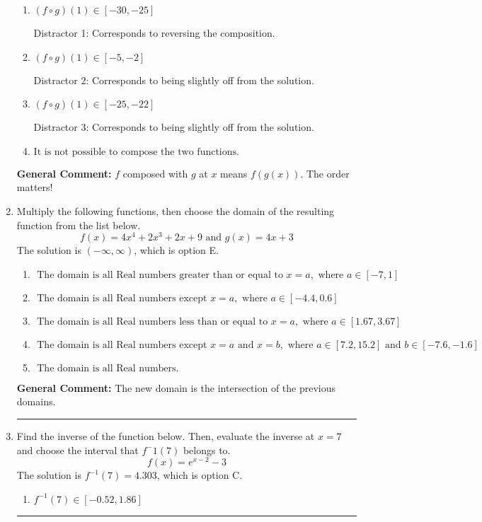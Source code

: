 \documentclass{extbook}[14pt]
\newcommand{\litem}[1]{\item #1

\rule{\textwidth}{0.4pt}}
\begin{document}
\begin{enumerate}
{\begin{enumerate}[label=\Alph*.]
* This is the correct solution
\item \( (f \circ g)(1) \in [-30, -25] \)

 Distractor 1: Corresponds to reversing the composition.
\item \( (f \circ g)(1) \in [-5, -2] \)

 Distractor 2: Corresponds to being slightly off from the solution.
\item \( (f \circ g)(1) \in [-25, -22] \)

 Distractor 3: Corresponds to being slightly off from the solution.
\item \( \text{It is not possible to compose the two functions.} \)


\end{enumerate}

\textbf{General Comment:} $f$ composed with $g$ at $x$ means $f(g(x))$. The order matters!
}
\litem{
Multiply the following functions, then choose the domain of the resulting function from the list below.
\[ f(x) = 4x^{4} +2 x^{3} +2 x + 9 \text{ and } g(x) = 4x + 3 \]The solution is \( (-\infty, \infty) \), which is option E.\begin{enumerate}[label=\Alph*.]
\item \( \text{ The domain is all Real numbers greater than or equal to } x = a, \text{ where } a \in [-7, 1] \)


\item \( \text{ The domain is all Real numbers except } x = a, \text{ where } a \in [-4.4, 0.6] \)


\item \( \text{ The domain is all Real numbers less than or equal to } x = a, \text{ where } a \in [1.67, 3.67] \)


\item \( \text{ The domain is all Real numbers except } x = a \text{ and } x = b, \text{ where } a \in [7.2, 15.2] \text{ and } b \in [-7.6, -1.6] \)


\item \( \text{ The domain is all Real numbers. } \)


\end{enumerate}

\textbf{General Comment:} The new domain is the intersection of the previous domains.
}
\litem{
Find the inverse of the function below. Then, evaluate the inverse at $x = 7$ and choose the interval that $f^-1(7)$ belongs to.
\[ f(x) = e^{x-2}-3 \]The solution is \( f^{-1}(7) = 4.303 \), which is option C.\begin{enumerate}[label=\Alph*.]
\item \( f^{-1}(7) \in [-0.52, 1.86] \)


\end{enumerate}}
\end{enumerate}
\end{document}

